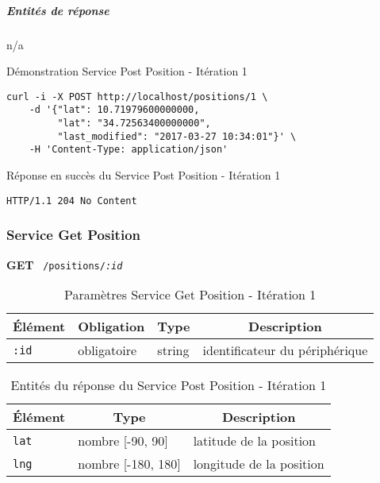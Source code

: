 \begin{appendices}
\subparagraph*{Entités de réponse}

n/a

\begin{listing}
    \caption{Démonstration Service Post Position - Itération 1}
    \begin{verbatim}
curl -i -X POST http://localhost/positions/1 \
    -d '{"lat": 10.71979600000000,
         "lat": "34.72563400000000",
         "last_modified": "2017-03-27 10:34:01"}' \
    -H 'Content-Type: application/json'
\end{verbatim}
\end{listing}

\begin{listing}[ht]
    \caption{Réponse en succès du Service Post Position - Itération 1}
\begin{verbatim}
HTTP/1.1 204 No Content
\end{verbatim}
\end{listing}

\subsubsection{Service Get Position}
\label{appendix:sprint1-position-get-doc}

\textbf{GET} \ \texttt{/positions/\textit{:id}}

\begin{table}[htbp]
    \centering
    \caption{Paramètres Service Get Position - Itération 1}
    \begin{tabular}{|l | l | l | l|}
        \hline
        \multicolumn{1}{|c|}{\textbf{Élément}} &
        \multicolumn{1}{c|}{\textbf{Obligation}} &
        \multicolumn{1}{c|}{\textbf{Type}} &
        \multicolumn{1}{c|}{\textbf{Description}} \\ \hline
        \verb|:id| & obligatoire & string & identificateur du périphérique \\ \hline
    \end{tabular}
\end{table}

\begin{table}[htbp]
    \centering
    \caption{Entités du réponse du Service Post Position - Itération 1}
    \begin{tabular}{|l | l | l|}
        \hline
        \multicolumn{1}{|c|}{\textbf{Élément}} &
        \multicolumn{1}{c|}{\textbf{Type}} &
        \multicolumn{1}{c|}{\textbf{Description}} \\ \hline
        \verb|lat| & nombre [-90, 90] & latitude de la position \\ \hline
        \verb|lng| & nombre [-180, 180] & longitude de la position \\ \hline
    \end{tabular}
\end{table}


\end{appendices}
